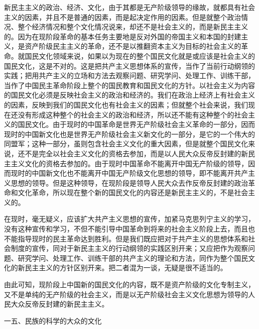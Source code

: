 \documentclass[UTF8, 12pt, a4paper]{ctexrep}
\begin{document}
新民主主义的政治、经济、文化，由于其都是无产阶级领导的缘故，就都具有社会主义的因素，并且不是普通的因素，而是起决定作用的因素。但是就整个政治情况、整个经济情况和整个文化情况说来，却还不是社会主义的，而是新民主主义的。因为在现阶段革命的基本任务主要地是反对外国的帝国主义和本国的封建主义，是资产阶级民主主义的革命，还不是以推翻资本主义为目标的社会主义的革命。就国民文化领域来说，如果以为现在的整个国民文化就是或应该是社会主义的国民文化，这是不对的。这是把共产主义思想体系的宣传，当作了当前行动纲领的实践；把用共产主义的立场和方法去观察问题、研究学问、处理工作、训练干部，当作了中国民主革命阶段上整个的国民教育和国民文化的方针。以社会主义为内容的国民文化必须是反映社会主义的政治和经济的。我们在政治上经济上有社会主义的因素，反映到我们的国民文化也有社会主义的因素；但就整个社会来说，我们现在还没有形成这种整个的社会主义的政治和经济，所以还不能有这种整个的社会主义的国民文化。由于现时的中国革命是世界无产阶级社会主义革命的一部分，因而现时的中国新文化也是世界无产阶级社会主义新文化的一部分，是它的一个伟大的同盟军；这种一部分，虽则包含社会主义文化的重大因素，但是就整个国民文化来说，还不是完全以社会主义文化的资格去参加，而是以人民大众反帝反封建的新民主主义文化的资格去参加的。由于现时中国革命不能离开中国无产阶级的领导，因而现时的中国新文化也不能离开中国无产阶级文化思想的领导，即不能离开共产主义思想的领导。但是这种领导，在现阶段是领导人民大众去作反帝反封建的政治革命和文化革命，所以现在整个新的国民文化的内容还是新民主主义的，不是社会主义的。

在现时，毫无疑义，应该扩大共产主义思想的宣传，加紧马克思列宁主义的学习，没有这种宣传和学习，不但不能引导中国革命到将来的社会主义阶段上去，而且也不能指导现时的民主革命达到胜利。但是我们既应把对于共产主义的思想体系和社会制度的宣传，同对于新民主主义的行动纲领的实践区别开来；又应把作为观察问题、研究学问、处理工作、训练干部的共产主义的理论和方法，同作为整个国民文化的新民主主义的方针区别开来。把二者混为一谈，无疑是很不适当的。

由此可知，现阶段上中国新的国民文化的内容，既不是资产阶级的文化专制主义，又不是单纯的无产阶级的社会主义，而是以无产阶级社会主义文化思想为领导的人民大众反帝反封建的新民主主义。

一五、民族的科学的大众的文化
\end{document}
